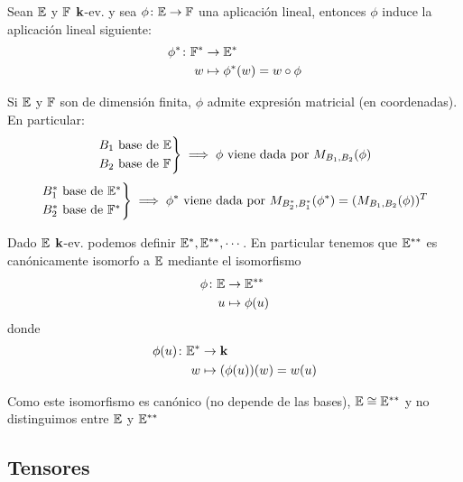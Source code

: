 \begin{prop}
	Sean $\mathbb{E}$ y $\mathbb{F}$ $\mathbf{k}$-ev. y sea $\phi \colon \mathbb{E} \to \mathbb{F}$ una
	aplicación lineal, entonces $\phi$ induce la aplicación
	lineal siguiente:
	\[
		\begin{aligned}
		\phi^* \colon \mathbb{F}^* &\to \mathbb{E}^*\\
		w &\mapsto \phi^*(w) = w \circ \phi
		\end{aligned}
	\]
\end{prop}
\begin{obs}
	Si $\mathbb{E}$ y $\mathbb{F}$ son de dimensión finita, $\phi$ admite expresión
	matricial (en coordenadas). En particular:
	\[
    	\displaystyle \begin{rcases} B_1 \text{ base de } \mathbb{E} \\ B_2
    	\text{ base de } \mathbb{F} \end{rcases} \implies \phi \text{ viene dada por }
    	M_{B_1,B_2}(\phi)
	\]
	\[
	    \displaystyle \begin{rcases} B_1^*
    	\text{ base de } \mathbb{E}^* \\ B_2^* \text{ base de } \mathbb{F}^*
    	\end{rcases} \implies \phi^* \text{ viene dada por }
	    M_{B_2^*,B_1^*}(\phi^*) = (M_{B_1,B_2}(\phi))^T
	\]
\end{obs}
\begin{prop}
	Dado $\mathbb{E}$ $\mathbf{k}$-ev. podemos definir $\mathbb{E}^*,\mathbb{E}^{**},\cdots$. En
	particular tenemos que $\mathbb{E}^{**}$ es canónicamente isomorfo a
	$\mathbb{E}$ mediante el isomorfismo
	\[
		\begin{aligned}
			\phi \colon \mathbb{E} &\to \mathbb{E}^{**}\\
			u &\mapsto \phi(u)
		\end{aligned}
	\]
	donde
	\[
		\begin{aligned}
			\phi(u) \colon \mathbb{E}^* &\to \mathbf{k} \\
			w &\mapsto (\phi(u))(w) = w(u)
		\end{aligned}
	\]
\end{prop}
\begin{obs}
	Como este isomorfismo es canónico (no depende de las bases),
	$\mathbb{E} \cong \mathbb{E}^{**}$ y no distinguimos entre $\mathbb{E}$ y $\mathbb{E}^{**}$
\end{obs}



\subsection{Tensores}

